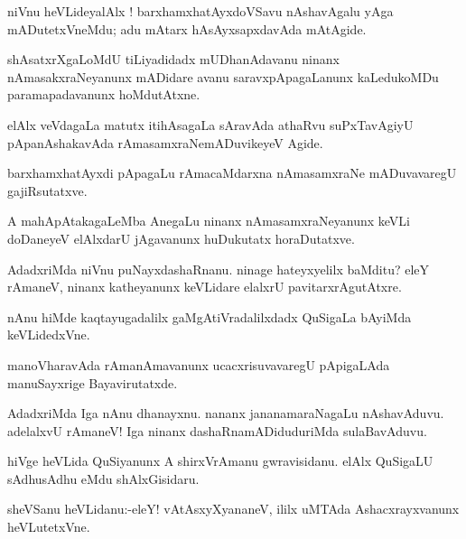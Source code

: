 \documentclass{article}
\begin{document}
\begin{mn}%
niVnu heVLideyalAlx ! barxhamxhatAyxdoVSavu nAshavAgalu yAga mADutetxVneMdu; adu mAtarx 
hAsAyxsapxdavAda mAtAgide.
\end{mn}

\begin{mn}%
shAsatxrXgaLoMdU tiLiyadidadx mUDhanAdavanu ninanx nAmasakxraNeyanunx mADidare avanu 
saravxpApagaLanunx kaLedukoMDu paramapadavanunx hoMdutAtxne.
\end{mn}

\begin{mn}%
elAlx veVdagaLa matutx itihAsagaLa sAravAda athaRvu suPxTavAgiyU pApanAshakavAda 
rAmasamxraNemADuvikeyeV Agide.
\end{mn}

\begin{mn}%
barxhamxhatAyxdi pApagaLu rAmacaMdarxna nAmasamxraNe mADuvavaregU gajiRsutatxve.
\end{mn}

\begin{mn}%
A mahApAtakagaLeMba AnegaLu ninanx nAmasamxraNeyanunx keVLi doDaneyeV elAlxdarU jAgavanunx
huDukutatx horaDutatxve.
\end{mn}

\begin{mn}%
AdadxriMda niVnu puNayxdashaRnanu. ninage hateyxyelilx baMditu? eleY rAmaneV, ninanx 
katheyanunx keVLidare elalxrU pavitarxrAgutAtxre.
\end{mn}

\begin{mn}%
nAnu hiMde kaqtayugadalilx gaMgAtiVradalilxdadx QuSigaLa bAyiMda keVLidedxVne.
\end{mn}

\begin{mn}%
manoVharavAda rAmanAmavanunx ucacxrisuvavaregU pApigaLAda manuSayxrige Bayavirutatxde.
\end{mn}

\begin{mn}%
AdadxriMda Iga nAnu dhanayxnu. nananx jananamaraNagaLu nAshavAduvu. adelalxvU rAmaneV! Iga 
ninanx dashaRnamADiduduriMda sulaBavAduvu.
\end{mn}

\begin{mn}%
hiVge heVLida QuSiyanunx A shirxVrAmanu gwravisidanu. elAlx QuSigaLU sAdhusAdhu eMdu 
shAlxGisidaru. 
\end{mn}

\begin{mn}%
sheVSanu heVLidanu:-eleY! vAtAsxyXyananeV, ililx uMTAda Ashacxrayxvanunx heVLutetxVne.
\end{mn}
\end{document}
